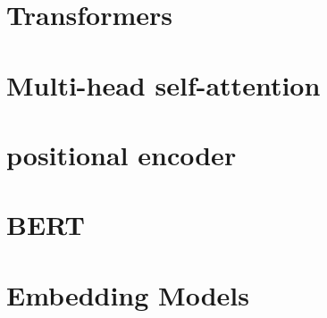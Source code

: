 \section{Transformers}
\section{Multi-head self-attention}
\section{positional encoder}
\section{BERT}
\section{Embedding Models}
